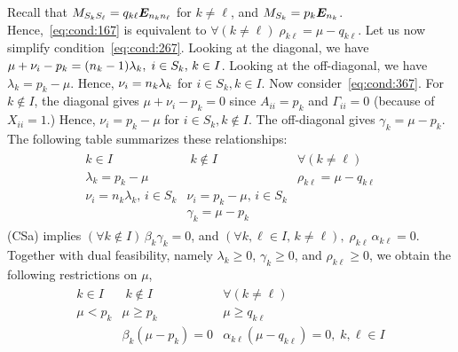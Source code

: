  Recall that $M_{S_k S_\ell} = q_{k\ell} \bm{E}_{n_k n_\ell}$ for $k \neq \ell$, and $M_{S_k} = p_k \bm{E}_{n_k}$. Hence,~\eqref{eq:cond:167} is equivalent to $\forall (k\neq \ell)\; \rho_{k\ell} = \mu - q_{k\ell}$. Let us now simplify condition~\eqref{eq:cond:267}. 
  Looking at the diagonal, we have $\mu + \nu_i - p_k = (n_k-1)\lambda_k, \; i \in S_k, \, k \in I$. Looking at the off-diagonal, we have $\lambda_k = p_k - \mu$. Hence, $\nu_i = n_k \lambda_k$ for $i \in S_k, k \in I$. Now consider~\eqref{eq:cond:367}. For $k \notin I$, the diagonal gives $\mu + \nu_i - p_k  = 0$ since $A_{ii} = p_k$ and $\Gamma_{ii} = 0$ (because of $X_{ii} = 1$.) Hence, $\nu_i = p_k-\mu$ for $i \in S_k, k \notin I$. The off-diagonal gives $\gamma_k = \mu - p_k$. The following table summarizes these relationships:
  \begin{align*}
    \begin{array}{l|l|l}
      k \in I & \; k \notin I & \forall (k \neq \ell)  \\
      \hline
      \lambda_k = p_k - \mu & & \rho_{k\ell} = \mu - q_{k \ell}\\
      \nu_i = n_k \lambda_k, \, i \in S_k & \nu_i = p_k - \mu,\, i \in S_k\\
      & \gamma_k = \mu - p_k& 
    \end{array}
  \end{align*}
  (CSa) implies $(\forall k \notin I)\, \beta_k \gamma_k = 0$, and  $(\forall k,\ell \in I, \, k\neq\ell),\; \rho_{k \ell} \,\alpha_{k \ell} = 0$. Together with dual feasibility, namely $\lambda_k \ge 0$, $\gamma_k \ge 0$,  and $\rho_{k\ell} \ge 0$, we obtain the following restrictions on $\mu$,
  \begin{align}\label{eq:table:325}
    \begin{array}{c|c|c}
      k \in I & \; k \notin I & \forall (k \neq \ell)  \\
      \hline
      \mu < p_k &  \mu \ge p_k &  \mu \ge q_{k \ell}\\
      & \beta_k(\mu - p_k) = 0& \alpha_{k \ell} (\mu - q_{k\ell}) = 0,\; k, \ell \in I
    \end{array}
  \end{align}


